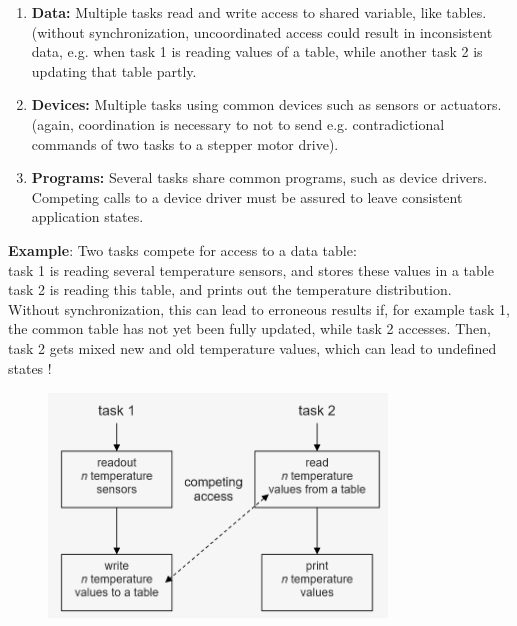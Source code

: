 \begin{enumerate}
	\item  \textbf{Data: }Multiple tasks read and write access to shared variable, like tables. (without synchronization, uncoordinated access could result in inconsistent data, e.g. when task 1 is reading values of a table, while another task 2 is updating that table partly.

	\item  \textbf{Devices: } Multiple tasks using common devices such as sensors or actuators. (again, coordination is necessary to not to send e.g. contradictional commands of two tasks to a stepper motor drive).

	\item  \textbf{Programs: } Several tasks share common programs, such as device drivers. Competing calls to a device driver must be assured to leave consistent application states.
\end{enumerate}

\textbf{ Example}: Two tasks compete for access to a data table:\\

task 1 is reading several temperature sensors, and stores these values in a table\\
task 2 is reading this table, and prints out the temperature distribution.\\

Without synchronization, this can lead to erroneous results if, for example task 1, the common table has not yet been fully updated, while task 2 accesses. Then, task 2 gets mixed new and old temperature values, which can lead to undefined states !

 	\begin{figure}[h]
    \centering
    \includegraphics[width=9cm, height=6cm]{Images/image102.png}
    \label{fig:Fig }
    \end{figure}

